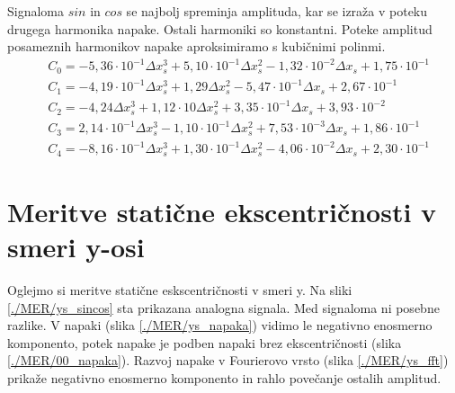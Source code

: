 Signaloma $sin$ in $cos$ se najbolj spreminja amplituda, kar se izraža v poteku drugega harmonika napake. Ostali harmoniki so konstantni.
Poteke amplitud posameznih harmonikov napake aproksimiramo s kubičnimi polinmi.
\begin{eqnarray}
&C_0 =-5,36\cdot 10^{-1}\Delta x_s^{3}+5,10\cdot 10^{-1}\Delta x_s^{2}-1,32\cdot 10^{-2}\Delta x_s+1,75\cdot 10^{-1} \\
&C_1 =-4,19\cdot 10^{-1}\Delta x_s^{3}+1,29\Delta x_s^{2}-5,47\cdot 10^{-1}\Delta x_s+2,67\cdot 10^{-1} \\             
&C_2 =-4,24\Delta x_s^{3}+1,12\cdot 10\Delta x_s^{2}+3,35\cdot 10^{-1}\Delta x_s+3,93\cdot 10^{-2} \\                  
&C_3 =2,14\cdot 10^{-1}\Delta x_s^{3}-1,10\cdot 10^{-1}\Delta x_s^{2}+7,53\cdot 10^{-3}\Delta x_s+1,86\cdot 10^{-1} \\ 
&C_4 =-8,16\cdot 10^{-1}\Delta x_s^{3}+1,30\cdot 10^{-1}\Delta x_s^{2}-4,06\cdot 10^{-2}\Delta x_s+2,30\cdot 10^{-1}
\end{eqnarray}





\section{Meritve statične ekscentričnosti v smeri y-osi}
Oglejmo si meritve statične eskscentričnosti v smeri y.
Na sliki \ref{./MER/ys_sincos} sta prikazana analogna signala. Med signaloma ni posebne razlike. 
V napaki (slika \ref{./MER/ys_napaka}) vidimo le negativno enosmerno komponento, potek napake je podben napaki brez ekscentričnosti (slika \ref{./MER/00_napaka}). 
Razvoj napake v Fourierovo vrsto (slika \ref{./MER/ys_fft}) prikaže negativno enosmerno komponento in rahlo povečanje ostalih amplitud.

